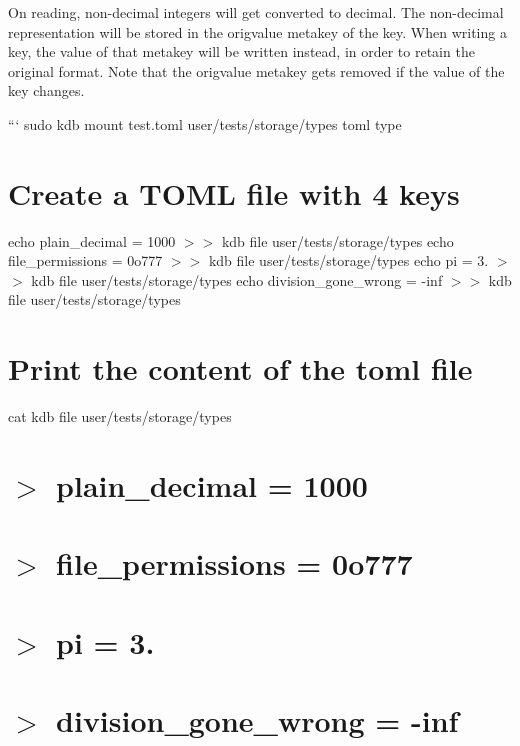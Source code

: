 On reading, non-\/decimal integers will get converted to decimal. The non-\/decimal representation will be stored in the {\ttfamily origvalue} metakey of the key. When writing a key, the value of that metakey will be written instead, in order to retain the original format. Note that the {\ttfamily origvalue} metakey gets removed if the value of the key changes.

``` sudo kdb mount test.\+toml user/tests/storage/types toml type\hypertarget{autotoc_md693_autotoc_md697}{}\section{Create a T\+O\+M\+L file with 4 keys}\label{autotoc_md693_autotoc_md697}
echo \textquotesingle{}plain\+\_\+decimal = 1000\textquotesingle{} $>$$>$ {\ttfamily kdb file user/tests/storage/types} echo \textquotesingle{}file\+\_\+permissions = 0o777\textquotesingle{} $>$$>$ {\ttfamily kdb file user/tests/storage/types} echo \textquotesingle{}pi = 3.\textquotesingle{} $>$$>$ {\ttfamily kdb file user/tests/storage/types} echo \textquotesingle{}division\+\_\+gone\+\_\+wrong = -\/inf\textquotesingle{} $>$$>$ {\ttfamily kdb file user/tests/storage/types}\hypertarget{autotoc_md693_autotoc_md698}{}\section{Print the content of the toml file}\label{autotoc_md693_autotoc_md698}
cat {\ttfamily kdb file user/tests/storage/types} \hypertarget{autotoc_md693_autotoc_md699}{}\section{$>$ plain\+\_\+decimal = 1000}\label{autotoc_md693_autotoc_md699}
\hypertarget{autotoc_md693_autotoc_md700}{}\section{$>$ file\+\_\+permissions = 0o777}\label{autotoc_md693_autotoc_md700}
\hypertarget{autotoc_md693_autotoc_md701}{}\section{$>$ pi = 3.}\label{autotoc_md693_autotoc_md701}
\hypertarget{autotoc_md693_autotoc_md702}{}\section{$>$ division\+\_\+gone\+\_\+wrong = -\/inf}\label{autotoc_md693_autotoc_md702}
